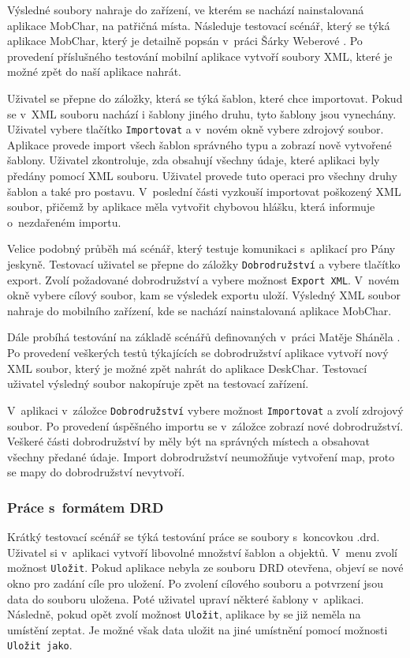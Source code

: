 \documentclass[thesis=B,czech]{resources/FITthesis}[2012/06/26]
\begin{document}
Výsledné soubory nahraje do zařízení, ve kterém se nachází nainstalovaná aplikace MobChar, na patřičná místa. Následuje testovací scénář, který se týká aplikace MobChar, který je detailně popsán v~práci Šárky Weberové \cite{Weberova_2017}. Po provedení příslušného testování mobilní aplikace vytvoří soubory XML, které je možné zpět do naší aplikace nahrát. \par

Uživatel se přepne do záložky, která se týká šablon, které chce importovat. Pokud se v~XML souboru nachází i šablony jiného druhu, tyto šablony jsou vynechány. Uživatel vybere tlačítko \texttt{Importovat} a v~novém okně vybere zdrojový soubor. Aplikace provede import všech šablon správného typu a zobrazí nově vytvořené šablony. Uživatel zkontroluje, zda obsahují všechny údaje, které aplikaci byly předány pomocí XML souboru. Uživatel provede tuto operaci pro všechny druhy šablon a také pro postavu. V~poslední části vyzkouší importovat poškozený XML soubor, přičemž by aplikace měla vytvořit chybovou hlášku, která informuje o~nezdařeném importu. \par

Velice podobný průběh má scénář, který testuje komunikaci s~aplikací pro Pány jeskyně. Testovací uživatel se přepne do záložky \texttt{Dobrodružství} a vybere tlačítko export. Zvolí požadované dobrodružství a vybere možnost \texttt{Export XML}. V~novém okně vybere cílový soubor, kam se výsledek exportu uloží. Výsledný XML soubor nahraje do mobilního zařízení, kde se nachází nainstalovaná aplikace MobChar. \par

Dále probíhá testování na základě scénářů definovaných v~práci Matěje Sháněla \cite{Shanel_2017}. Po provedení veškerých testů týkajících se dobrodružství aplikace vytvoří nový XML soubor, který je možné zpět nahrát do aplikace DeskChar. Testovací uživatel výsledný soubor nakopíruje zpět na testovací zařízení. \par

V~aplikaci v~záložce \texttt{Dobrodružství} vybere možnost \texttt{Importovat} a zvolí zdrojový soubor. Po provedení úspěšného importu se v~záložce zobrazí nové dobrodružství. Veškeré části dobrodružství by měly být na správných místech a obsahovat všechny předané údaje. Import dobrodružství neumožňuje vytvoření map, proto se mapy do dobrodružství nevytvoří. 

\subsubsection{Práce s~formátem DRD}
Krátký testovací scénář se týká testování práce se soubory s~koncovkou .drd. Uživatel si v~aplikaci vytvoří libovolné množství šablon a objektů. V~menu zvolí možnost \texttt{Uložit}. Pokud aplikace nebyla ze souboru DRD otevřena, objeví se nové okno pro zadání cíle pro uložení. Po zvolení cílového souboru a potvrzení jsou data do souboru uložena. Poté uživatel upraví některé šablony v~aplikaci. Následně, pokud opět zvolí možnost \texttt{Uložit}, aplikace by se již neměla na umístění zeptat. Je možné však data uložit na jiné umístnění pomocí možnosti \texttt{Uložit jako}. \par
\end{document}
